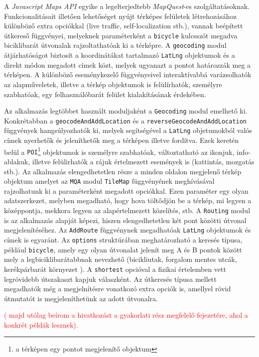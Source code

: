 \par A \textit{Javascript Maps API} egyike a legelterjedtebb \textit{MapQuest}-es szolgáltatásoknak. Funkcionalitásait illetően lehetőséget nyújt térképes felületek létrehozásához különböző extra opciókkal (live traffic, self-localization stb.), vannak beépített útkereső függvényei, melyeknek paraméterként a {\tt bicycle} kulcsszót megadva biciklibarát útvonalak rajzoltathatóak ki a térképre. A {\tt geocoding} modul átjárhatóságot biztosít a koordinátákat tartalmazó {\tt LatLng} objektumok és a direkt módon megadott címek közt, melyek ugyanazt a pontot határozzák meg a térképen. A különböző eseménykezelő függvényeivel interaktívabbá varázsolhatók az alapműveletek, illetve a térkép objektumok is felülírhatók, személyre szabhatóak, egy felhasználóbarát felület kialakításának érdekében.  
\par 
Az alkalmazás legtöbbet használt moduljaként a {\tt Geocoding} modul emelhető ki. Konkrétabban a {\tt geocodeAndAddLocation} és a {\tt reverseGeocodeAndAddLocation} függvények hangsúlyozhatók ki, melyek segítségével a {\tt LatLng} objetumokból valós címek nyerhetők és jeleníthetők meg a térképen illetve fordítva. Ezek keretén belül a {\tt POI}\footnote{a térképen egy pontot megjelenítő objektum} objektumok is személyre szabhatóak, változtatható az ikonjuk, info-ablakuk, illetve felülirhatók a rájuk értelmezett események is (kattintás, mozgatás stb.). Az alkalmazás elengedhetetlen része a minden oldalon megjelenő térkép objektum amelyet az {\tt MQA} modul {\tt TileMap} függvényének meghívásával rajzolhatunk ki a paraméterként megadott opciókkal. Ezen paraméter egy olyan adatszerkezet, melyben megadható, hogy hova töltődjön be a térkép, mi legyen a középpontja, mekkora legyen az alapértelmezett közelítés, stb. A  {\tt Routing} modul is az alkalmazás alapját képezi, hiszen elengedhetetlen két pont közötti útvonal megjelenítéséhez. Az  {\tt AddRoute} függvénynek megadhatóak  {\tt LatLng} objektumok és címek is egyaránt. Az  {\tt options} struktúrában meghatározható a keresés típusa, például  {\tt bicycle}, amely egy olyan útvonalat jelenít meg A és B pontok között mely a legbiciklibarátabbnak nevezhető (bicikliutak, forgalom mentes utcák, kerékpárbarát környezet ). A  {\tt shortest} opcióval a fizikai értelemben vett legrövidebb útszakaszt kapjuk válaszként. Az útkeresés típusa mellett megadhatók még a megjelnítésre vonatkozó extra opciók is, amellyel rövid útmutatót is megjeleníthetünk az adott útvonalra.

\textcolor{red}{ ( majd utólag beírom a hivatkozást a gyakorlati rész megfelelő fejezetére, ahol a konkrét példák lesznek).}
%
